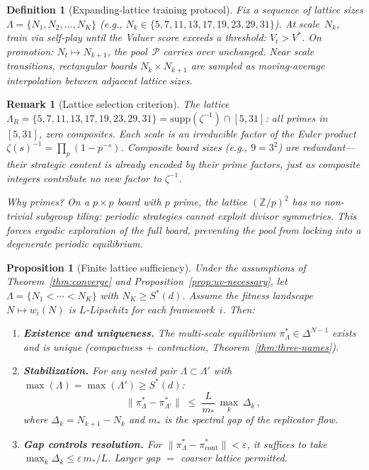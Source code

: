 \documentclass[11pt,a4paper]{article}
\newtheorem{proposition}[theorem]{Proposition}
\newtheorem{definition}[theorem]{Definition}
\newtheorem{remark}[theorem]{Remark}
\newcommand{\cP}{\mathcal{P}}
\begin{document}
\begin{definition}[Expanding-lattice training protocol]\label{def:expanding}
Fix a sequence of lattice sizes
$\Lambda = \{N_1, N_2, \ldots, N_K\}$
(e.g., $N_k \in \{5, 7, 11, 13, 17, 19, 23, 29, 31\}$).
At scale~$N_k$, train via self-play until the Valuer score
exceeds a threshold: $V_t > V^*$.
On promotion: $N_t \mapsto N_{k+1}$, the pool~$\cP$ carries
over unchanged.
Near scale transitions, rectangular boards $N_k \times N_{k+1}$
are sampled as moving-average interpolation between
adjacent lattice sizes.
\end{definition}

\begin{remark}[Lattice selection criterion]\label{rem:lattice-criterion}
The lattice $\Lambda_R = \{5, 7, 11, 13, 17, 19, 23, 29, 31\}
= \mathrm{supp}(\zeta^{-1}) \cap [5, 31]$:
all primes in $[5, 31]$, zero composites.
Each scale is an irreducible factor of the Euler product
$\zeta(s)^{-1} = \prod_p (1 - p^{-s})$.
Composite board sizes (e.g., $9 = 3^2$) are redundant---their
strategic content is already encoded by their prime factors,
just as composite integers contribute no new factor to $\zeta^{-1}$.

\emph{Why primes?}
On a $p \times p$ board with $p$ prime, the lattice
$(\mathbb{Z}/p)^2$ has no non-trivial subgroup tiling:
periodic strategies cannot exploit divisor symmetries.
This forces ergodic exploration of the full board,
preventing the pool from locking into a degenerate
periodic equilibrium.
\end{remark}

\begin{proposition}[Finite lattice sufficiency]%
\label{prop:lattice-complete}
Under the assumptions of Theorem~\ref{thm:converge}
and Proposition~\ref{prop:uv-necessary},
let $\Lambda = \{N_1 < \cdots < N_K\}$ with
$N_K \geq S^*(d)$.
Assume the fitness landscape
$N \mapsto w_i(N)$ is $L$-Lipschitz for each
framework~$i$.
Then:
\begin{enumerate}[nosep, label=\textup{(\roman*)}]
\item \textbf{Existence and uniqueness.}
  The multi-scale equilibrium
  $\pi^*_\Lambda \in \Delta^{N-1}$ exists and is unique
  (compactness $+$ contraction,
  Theorem~\ref{thm:three-names}).
\item \textbf{Stabilization.}
  For any nested pair $\Lambda \subset \Lambda'$ with
  $\max(\Lambda) = \max(\Lambda') \geq S^*(d)$:
  \[
    \|\pi^*_{\Lambda} - \pi^*_{\Lambda'}\|
    \;\leq\;
    \frac{L}{m_*}\,
    \max_{k}\, \Delta_k\,,
  \]
  where $\Delta_k = N_{k+1} - N_k$ and
  $m_*$ is the spectral gap of the replicator flow.
\item \textbf{Gap controls resolution.}
  For $\|\pi^*_\Lambda - \pi^*_{\mathrm{cont}}\|
  < \varepsilon$, it suffices to take
  $\max_k \Delta_k \leq \varepsilon\, m_* / L$.
  Larger gap $=$ coarser lattice permitted.
\end{enumerate}
\end{proposition}
\end{document}
